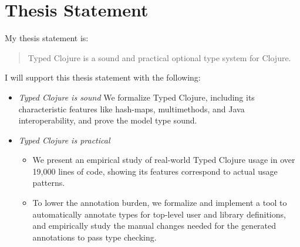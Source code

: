 \section{Thesis Statement}

My thesis statement is:

\begin{quote}
Typed Clojure is a sound and practical optional type system for Clojure.
\end{quote}

I will support this thesis statement with the following:

\begin{itemize}
  \item \emph{Typed Clojure is sound} We formalize Typed Clojure, including
    its characteristic features like hash-maps, multimethods, and Java interoperability,
    and prove the model type sound.
  \item \emph{Typed Clojure is practical} 
    \begin{itemize}
      \item We present an empirical study of real-world Typed Clojure usage
        in over 19,000 lines of code, showing its features correspond to actual usage patterns.
       \item %
         To lower the annotation burden,
          we formalize and implement a tool to automatically annotate types for top-level
          user and library definitions, and empirically study the manual changes needed for the generated annotations
          to pass type checking.
    \end{itemize}
\end{itemize}

